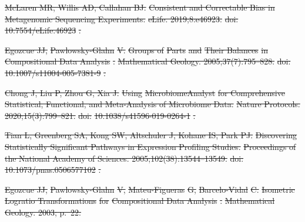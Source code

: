 \documentclass[10pt,letterpaper]{article}
\providecommand{\DIFdeltex}[1]{{\protect\color{red}\sout{#1}}}                      %
\providecommand{\DIFdel}[1]{\texorpdfstring{\DIFdeltex{#1}}{}} %
\begin{document}
\DIFdel{McLaren MR, Willis AD, Callahan BJ.
}%
\DIFdel{Consistent and Correctable Bias in Metagenomic Sequencing
  Experiments.
}%
\DIFdel{eLife. 2019;8:e46923.
}%
\DIFdel{doi:}%
\DIFdel{10.7554/eLife.46923}%
\DIFdel{.
}%

\DIFdel{Egozcue JJ, }%
\DIFdel{Pawlowsky-Glahn}%
\DIFdel{V.
}%
\DIFdel{Groups of }%
\DIFdel{Parts}%
\DIFdel{and }%
\DIFdel{Their Balances}%
\DIFdel{in }%
\DIFdel{Compositional Data
  Analysis}%
\DIFdel{.
}%
\DIFdel{Mathematical Geology. 2005;37(7):795--828.
}%
\DIFdel{doi:}%
\DIFdel{10.1007/s11004-005-7381-9}%
\DIFdel{.
}%

\DIFdel{Chong J, Liu P, Zhou G, Xia J.
}%
\DIFdel{Using }%
\DIFdel{MicrobiomeAnalyst}%
\DIFdel{for Comprehensive Statistical,
  Functional, and Meta-Analysis of Microbiome Data.
}%
\DIFdel{Nature Protocols. 2020;15(3):799--821.
}%
\DIFdel{doi:}%
\DIFdel{10.1038/s41596-019-0264-1}%
\DIFdel{.
}%

\DIFdel{Tian L, Greenberg SA, Kong SW, Altschuler J, Kohane IS, Park PJ.
}%
\DIFdel{Discovering Statistically Significant Pathways in Expression
  Profiling Studies.
}%
\DIFdel{Proceedings of the National Academy of Sciences.
  2005;102(38):13544--13549.
}%
\DIFdel{doi:}%
\DIFdel{10.1073/pnas.0506577102}%
\DIFdel{.
}%

\DIFdel{Egozcue JJ, }%
\DIFdel{Pawlowsky-Glahn}%
\DIFdel{V, }%
\DIFdel{Mateu-Figueras}%
\DIFdel{G, }%
\DIFdel{Barcelo-Vidal}%
\DIFdel{C.
}%
\DIFdel{Isometric }%
\DIFdel{Logratio Transformations}%
\DIFdel{for }%
\DIFdel{Compositional Data
  Analysis}%
\DIFdel{.
}%
\DIFdel{Mathematical Geology. 2003; p.~22.
}%
\end{document}
